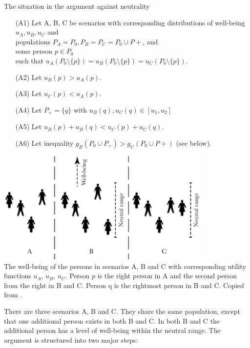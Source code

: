 \begin{Counterexample}{The situation in the argument against neutrality}{}
\begin{enumerate}
\item[(A1)]
Let A, B, C be scenarios with  
corresponding distributions of well-being $u_A, u_B, u_C$ and \\
populations $P_A = P_0, P_B = P_C = P_0 \cup P+$, and \\
some person $p \in P_0$ \\
such that $u_A(P_0 \setminus \{p\}) = u_B(P_0 \setminus \{p\}) = u_C(P_0 \setminus \{p\}).$
\item[(A2)] Let $u_B(p) > u_A(p).$
\item[(A3)] Let $u_C(p) < u_A(p).$
\item[(A4)] Let $P_+ = \{q\}$ with $u_B(q), u_C(q) \in [u_1, u_2]$
\item[(A5)] Let $u_B(p) + u_B(q) < u_C(p) + u_C(q).$
\item[(A6)] Let inequality $g_B(P_0 \cup P_+) > g_C(P_0 \cup P+)$ (see below). 
\end{enumerate}
\begin{center}
  \includegraphics[width=0.8\textwidth]{3-fig-1} \\
  \footnotesize The well-being of the persons in scenarios A, B and C with corresponding utility functions $u_A$, $u_B$, $u_C$. Person $p$ is the right person in A and the second person from the right in B and C. Person q is the rightmost person in B and C. Copied from .
\end{center}
\end{Counterexample}

There are three scenarios A, B and C. They share the same population, except that one additional person exists in both B and C. In both B and C the additional person has a level of well-being within the neutral range. The argument is structured into two major steps:  

